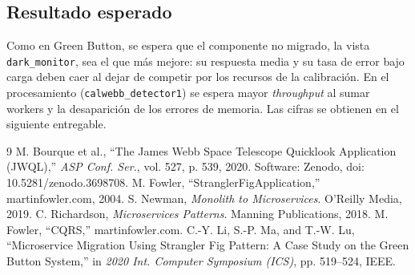 \documentclass[conference]{IEEEtran}
\begin{document}
\subsection{Resultado esperado}

Como en Green Button, se espera que el componente no migrado, la vista \texttt{dark\_monitor}, sea el que m\'as mejore: su respuesta media y su tasa de error bajo carga deben caer al dejar de competir por los recursos de la calibraci\'on. En el procesamiento (\texttt{calwebb\_detector1}) se espera mayor \textit{throughput} al sumar workers y la desaparici\'on de los errores de memoria. Las cifras se obtienen en el siguiente entregable.

\begin{thebibliography}{9}
 M. Bourque et al., ``The James Webb Space Telescope Quicklook Application (JWQL),'' \textit{ASP Conf. Ser.}, vol. 527, p. 539, 2020. Software: Zenodo, doi: 10.5281/zenodo.3698708.
 M. Fowler, ``StranglerFigApplication,'' martinfowler.com, 2004.
 S. Newman, \textit{Monolith to Microservices}. O'Reilly Media, 2019.
 C. Richardson, \textit{Microservices Patterns}. Manning Publications, 2018.
 M. Fowler, ``CQRS,'' martinfowler.com.
 C.-Y. Li, S.-P. Ma, and T.-W. Lu, ``Microservice Migration Using Strangler Fig Pattern: A Case Study on the Green Button System,'' in \textit{2020 Int. Computer Symposium (ICS)}, pp. 519--524, IEEE.
\end{thebibliography}
\end{document}
